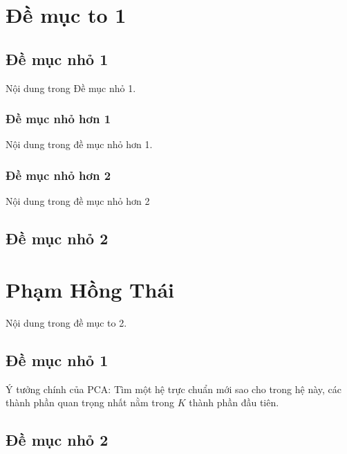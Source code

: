 \documentclass[12pt]{article}
\begin{document}
\tableofcontents
\section{Đề mục to 1}
\subsection{Đề mục nhỏ 1}
Nội dung trong Đề mục nhỏ 1.
\subsubsection{Đề mục nhỏ hơn 1}
Nội dung trong đề mục nhỏ hơn 1.
\subsubsection{Đề mục nhỏ hơn 2}
Nội dung trong đề mục nhỏ hơn 2
\subsection{Đề mục nhỏ 2}

\section{Phạm Hồng Thái}
Nội dung trong đề mục to 2.
\subsection{Đề mục nhỏ 1}
\caption[]{Ý tưởng chính của PCA: Tìm một hệ trực chuẩn mới sao cho trong hệ này, các thành phần quan trọng nhất nằm trong $K$ thành phần đầu tiên.}
\subsection{Đề mục nhỏ 2}
\end{document}
